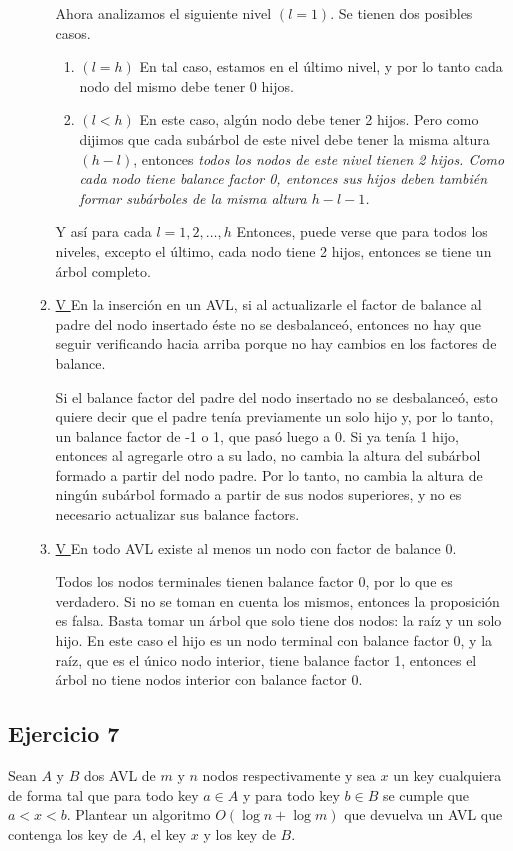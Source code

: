 \documentclass{article}
\begin{document}
\begin{enumerate}
\begin{enumerate}
Ahora analizamos el siguiente nivel $(l=1)$. Se tienen dos posibles casos.
\begin{enumerate}
    \item $(l=h)$ En tal caso, estamos en el último nivel, y por lo tanto cada nodo del mismo debe tener 0 hijos.
    \item $(l<h)$ En este caso, algún nodo debe tener 2 hijos. Pero como dijimos que cada subárbol de este nivel debe tener la misma altura $(h-l)$, entonces \em{todos} los nodos de este nivel tienen 2 hijos. Como cada nodo tiene balance factor 0, entonces sus hijos deben también formar subárboles de la misma altura $h-l-1$.
\end{enumerate}

Y así para cada $l = 1, 2, \dots, h$ Entonces, puede verse que para todos los niveles, excepto el último, cada nodo tiene 2 hijos, entonces se tiene un árbol completo.

\item \underline{ V } En la inserción en un AVL, si al actualizarle el factor de balance al padre del nodo insertado éste no se desbalanceó, entonces no hay que seguir verificando hacia arriba porque no hay cambios en los factores de balance.

Si el balance factor del padre del nodo insertado no se desbalanceó, esto quiere decir que el padre tenía previamente un solo hijo y, por lo tanto, un balance factor de -1 o 1, que pasó luego a 0. Si ya tenía 1 hijo, entonces al agregarle otro a su lado, no cambia la altura del subárbol formado a partir del nodo padre. Por lo tanto, no cambia la altura de ningún subárbol formado a partir de sus nodos superiores, y no es necesario actualizar sus balance factors.

\item \underline{ V } En todo AVL existe al menos un nodo con factor de balance 0.

Todos los nodos terminales tienen balance factor 0, por lo que es verdadero. Si no se toman en cuenta los mismos, entonces la proposición es falsa. Basta tomar un árbol que solo tiene dos nodos: la raíz y un solo hijo. En este caso el hijo es un nodo terminal con balance factor 0, y la raíz, que es el único nodo interior, tiene balance factor 1, entonces el árbol no tiene nodos interior con balance factor 0.

\end{enumerate}
\end{enumerate}


\subsection*{Ejercicio 7}
Sean $A$ y $B$ dos AVL de $m$ y $n$ nodos respectivamente y sea $x$ un key cualquiera de forma tal que para todo key $a\in A$ y para todo key $b\in B$ se cumple que $a < x < b$. Plantear un algoritmo $O(\log n + \log m)$ que devuelva un AVL que contenga los key de $A$, el key $x$ y los key de $B$.
\end{document}
